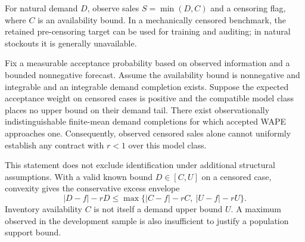 For natural demand $D$, observe sales $S=\min(D,C)$ and a censoring flag, where $C$ is an availability bound. In a mechanically censored benchmark, the retained pre-censoring target can be used for training and auditing; in natural stockouts it is generally unavailable.

\begin{proposition}
\label{prop:identification}
Fix a measurable acceptance probability based on observed information and a bounded nonnegative forecast. Assume the availability bound is nonnegative and integrable and an integrable demand completion exists. Suppose the expected acceptance weight on censored cases is positive and the compatible model class places no upper bound on their demand tail. There exist observationally indistinguishable finite-mean demand completions for which accepted WAPE approaches one. Consequently, observed censored sales alone cannot uniformly establish any contract with $r<1$ over this model class.
\end{proposition}
This statement does not exclude identification under additional structural assumptions. With a valid known bound $D\in[C,U]$ on a censored case, convexity gives the conservative excess envelope
\begin{equation}
 |D-f|-rD \leq
 \max\{|C-f|-rC,\ |U-f|-rU\}.
 \label{eq:envelope}
\end{equation}
Inventory availability $C$ is not itself a demand upper bound $U$. A maximum observed in the development sample is also insufficient to justify a population support bound.

